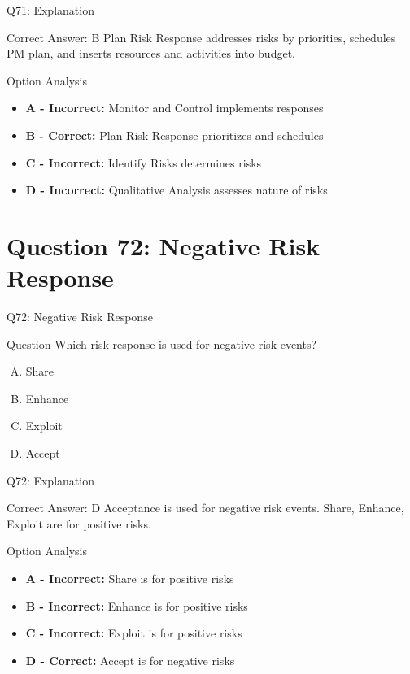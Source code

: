 \documentclass{beamer}
\begin{document}
	\begin{frame}{Q71: Explanation}
		\begin{block}{Correct Answer: B}
			Plan Risk Response addresses risks by priorities, schedules PM plan, and inserts resources and activities into budget.
		\end{block}
		\begin{block}{Option Analysis}
			\begin{itemize}
				\item \textbf{A - Incorrect:} Monitor and Control implements responses
				\item \textbf{B - Correct:} Plan Risk Response prioritizes and schedules
				\item \textbf{C - Incorrect:} Identify Risks determines risks
				\item \textbf{D - Incorrect:} Qualitative Analysis assesses nature of risks
			\end{itemize}
		\end{block}
	\end{frame}
	
	\section{Question 72: Negative Risk Response}
	
	\begin{frame}{Q72: Negative Risk Response}
		\begin{block}{Question}
			Which risk response is used for negative risk events?
		\end{block}
		\begin{enumerate}[(A)]
			\item Share
			\item Enhance
			\item Exploit
			\item Accept
		\end{enumerate}
	\end{frame}
	
	\begin{frame}{Q72: Explanation}
		\begin{block}{Correct Answer: D}
			Acceptance is used for negative risk events. Share, Enhance, Exploit are for positive risks.
		\end{block}
		\begin{block}{Option Analysis}
			\begin{itemize}
				\item \textbf{A - Incorrect:} Share is for positive risks
				\item \textbf{B - Incorrect:} Enhance is for positive risks
				\item \textbf{C - Incorrect:} Exploit is for positive risks
				\item \textbf{D - Correct:} Accept is for negative risks
			\end{itemize}
		\end{block}
	\end{frame}
	
\end{document}
